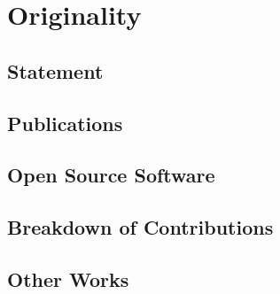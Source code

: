 \chapter*{Originality}

\section*{Statement}

\section*{Publications}

\section*{Open Source Software}

\section*{Breakdown of Contributions}

\section*{Other Works}
